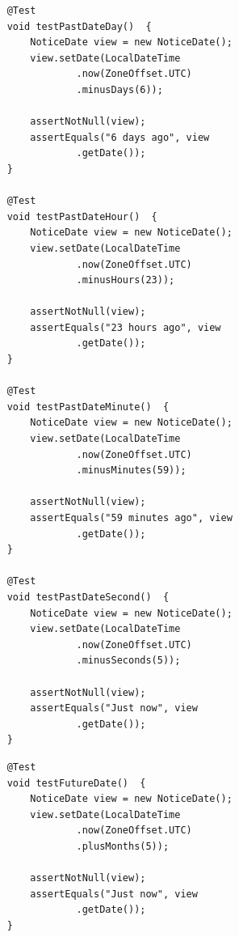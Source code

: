 \begin{listing}[!ht]
\begin{verbatim}
    @Test
    void testPastDateDay()  {
        NoticeDate view = new NoticeDate();
        view.setDate(LocalDateTime
                .now(ZoneOffset.UTC)
                .minusDays(6));

        assertNotNull(view);
        assertEquals("6 days ago", view
                .getDate());
    }

    @Test
    void testPastDateHour()  {
        NoticeDate view = new NoticeDate();
        view.setDate(LocalDateTime
                .now(ZoneOffset.UTC)
                .minusHours(23));

        assertNotNull(view);
        assertEquals("23 hours ago", view
                .getDate());
    }

    @Test
    void testPastDateMinute()  {
        NoticeDate view = new NoticeDate();
        view.setDate(LocalDateTime
                .now(ZoneOffset.UTC)
                .minusMinutes(59));

        assertNotNull(view);
        assertEquals("59 minutes ago", view
                .getDate());
    }

    @Test
    void testPastDateSecond()  {
        NoticeDate view = new NoticeDate();
        view.setDate(LocalDateTime
                .now(ZoneOffset.UTC)
                .minusSeconds(5));

        assertNotNull(view);
        assertEquals("Just now", view
                .getDate());
    }

\end{verbatim}
\end{listing}

\clearpage

\begin{listing}[!ht]
\begin{verbatim}
    @Test
    void testFutureDate()  {
        NoticeDate view = new NoticeDate();
        view.setDate(LocalDateTime
                .now(ZoneOffset.UTC)
                .plusMonths(5));

        assertNotNull(view);
        assertEquals("Just now", view
                .getDate());
    }
\end{verbatim}
\end{listing}

